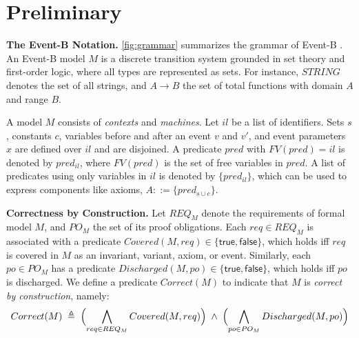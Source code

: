 \section{Preliminary}\label{sec:preliminary}



\textbf{The Event-B Notation.}
\autoref{fig:grammar} summarizes the grammar of Event-B \cite{abrial2010modeling}.
An Event-B model $M$ is a discrete transition system grounded in set theory and first-order logic, where all types are represented as sets.
For instance, $STRING$ denotes the set of all strings, and $A \rightarrow B$ the set of total functions with domain $A$ and range $B$.

A model $M$ consists of \emph{contexts} and \emph{machines}.
Let $il$ be a list of identifiers. Sets $s$, constants $c$, variables before and after an event $v$ and $v'$, and event parameters $x$ are defined over $il$ and are disjoined.
A predicate $pred$ with $FV(pred) = il$ is denoted by $pred_{il}$, where $FV(pred)$ is the set of free variables in $pred$.
A list of predicates using only variables in $il$ is denoted by $\{pred_{il}\}$, which can be used to express components like axioms, $A ::= \{pred_{s \cup c}\}$.

\noindent
\textbf{Correctness by Construction.}
Let $REQ_M$ denote the requirements of formal model $M$, and $PO_M$ the set of its proof obligations.
Each $req \in REQ_M$ is associated with a predicate $Covered(M, req) \in \{\mathsf{true}, \mathsf{false}\}$, which holds iff $req$ is covered in $M$ as an invariant, variant, axiom, or event.
Similarly, each $po \in PO_M$ has a predicate $Discharged(M,po) \in \{\mathsf{true}, \mathsf{false}\}$, which holds iff $po$ is discharged.
We define a predicate $Correct(M)$ to indicate that $M$ is \emph{correct by construction}, namely:
{\footnotesize\begin{equation}
Correct(M) \;\triangleq\;
\Bigl(\bigwedge_{req \in REQ_M} Covered(M, req)\Bigr)
\;\wedge\;
\Bigl(\bigwedge_{po \in PO_M} Discharged(M,po)\Bigr)
\label{eq:correctness}
\end{equation}}
